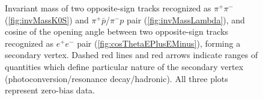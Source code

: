 \begin{figure}[b!]
{\begin{subfigure}[b]{\linewidth}{
                }
  \end{subfigure}
}
\quad
\parbox{0.31\textwidth}{
  \centering
  \begin{subfigure}[b]{\linewidth}{
                }
  \end{subfigure}
}\vspace{-4pt}
\caption[Invariant mass of two opposite-sign tracks and cosine of the opening angle between tracks forming a secondary vertex.]%
    {Invariant mass of two opposite-sign tracks recognized as $\pi^{+}\pi^{-}$ (\ref{fig:invMassK0S}) and $\pi^{+}\bar{p}$/$\pi^{-}p$ pair (\ref{fig:invMassLambda}), and cosine of the opening angle between two opposite-sign tracks recognized as $e^{+}e^{-}$ pair (\ref{fig:cosThetaEPlusEMinus}), forming a secondary vertex. Dashed red lines and red arrows indicate ranges of quantities which define particular nature of the secondary vertex (photoconversion/resonance decay/hadronic). All three plots represent zero-bias data.}\label{fig:secVtxTypeSelection}\vspace{-20pt}%
\end{figure}

